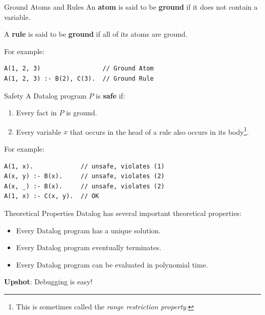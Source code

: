 \begin{frame}[fragile]{Ground Atoms and Rules}
An \textbf{atom} is said to be \textbf{ground} if it does not contain a variable.

A \textbf{rule} is said to be \textbf{ground} if all of its atoms are ground.

For example:
\begin{lstlisting}[language=flix,xleftmargin=0.8cm]
A(1, 2, 3)                 // Ground Atom
A(1, 2, 3) :- B(2), C(3).  // Ground Rule
\end{lstlisting}
\end{frame}

\begin{frame}[fragile]{Safety}
A Datalog program $P$ is \textbf{safe} if:
\begin{enumerate}
    \item Every fact in $P$ is ground.
    \item Every variable $x$ that occurs in the head of a rule also occurs in
    its body\footnote{This is sometimes called the \textsl{range restriction
    property}.}.
\end{enumerate}

For example:
\begin{lstlisting}[language=flix,xleftmargin=0.8cm]
A(1, x).             // unsafe, violates (1)
A(x, y) :- B(x).     // unsafe, violates (2)
A(x, _) :- B(x).     // unsafe, violates (2)
A(1, x) :- C(x, y).  // OK
\end{lstlisting}
\end{frame}

\begin{frame}{Theoretical Properties}
Datalog has several important theoretical properties:

\begin{itemize}
    \item Every Datalog program has a unique solution.
    \item Every Datalog program eventually terminates.
    \item Every Datalog program can be evaluated in polynomial time.
\end{itemize}

\medskip

\pause

\textbf{Upshot}: Debugging is easy! 

\end{frame}

